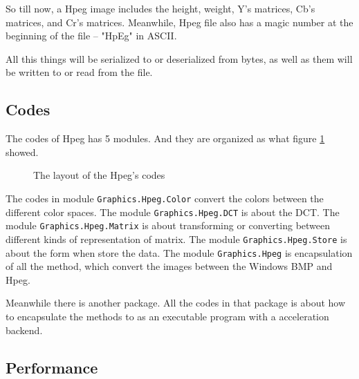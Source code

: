 \documentclass{article}
\begin{document}
So till now, a Hpeg image includes the height, weight, Y's matrices, Cb's matrices, and Cr's matrices.
Meanwhile, Hpeg file also has a magic number at the beginning of the file -- "HpEg" in ASCII.

All this things will be serialized to or deserialized from bytes, as well as them will be written to or
read from the file.

\subsection{Codes}
\label{sec:hpeg:codes}

The codes of Hpeg has 5 modules. And they are organized as what figure \ref{fig:hpeg:layout} showed.

\begin{figure}
    \centering
    \caption{The layout of the Hpeg's codes}
    \label{fig:hpeg:layout}
\end{figure}

The codes in module \verb|Graphics.Hpeg.Color| convert the colors between the different color spaces.
The module \verb|Graphics.Hpeg.DCT| is about the DCT.
The module \verb|Graphics.Hpeg.Matrix| is about transforming or converting between different kinds of representation of matrix.
The module \verb|Graphics.Hpeg.Store| is about the form when store the data.
The module \verb|Graphics.Hpeg| is encapsulation of all the method, which convert the images between the Windows BMP and Hpeg.

Meanwhile there is another package. All the codes in that package is about how to encapsulate
the methods to as an executable program with a acceleration backend.

\subsection{Performance}
\label{sec:hpeg:performance}
\end{document}
